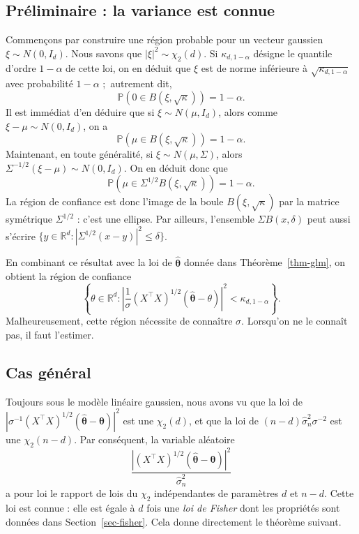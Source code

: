 \documentclass[
  10,
  letterpaper,
  DIV=11,
  numbers=noendperiod]{scrreport}
\newcommand{\bt}{\boldsymbol{\theta}}
\theoremstyle{plain}
\theoremstyle{definition}
\theoremstyle{plain}
\theoremstyle{definition}
\theoremstyle{definition}
\theoremstyle{plain}
\theoremstyle{remark}
\begin{document}
\hypertarget{pruxe9liminaire-la-variance-est-connue}{%
\subsection*{Préliminaire : la variance est
connue}\label{pruxe9liminaire-la-variance-est-connue}}

Commençons par construire une région probable pour un vecteur gaussien
\(\xi \sim N(0,I_d)\). Nous savons que \(|\xi|^2 \sim \chi_2(d)\). Si
\(\kappa_{d,1-\alpha}\) désigne le quantile d'ordre \(1-\alpha\) de
cette loi, on en déduit que \(\xi\) est de norme inférieure à
\(\sqrt{\kappa_{d,1-\alpha}}\) avec probabilité \(1-\alpha\) ;~autrement
dit, \[ \mathbb{P}(0 \in B(\xi, \sqrt{\kappa})) = 1-\alpha.\] Il est
immédiat d'en déduire que si \(\xi \sim N(\mu, I_d)\), alors comme
\(\xi - \mu \sim N(0,I_d)\), on a
\[ \mathbb{P}(\mu \in B(\xi, \sqrt{\kappa})) = 1-\alpha. \] Maintenant,
en toute généralité, si \(\xi \sim N(\mu,\Sigma)\), alors
\(\Sigma^{-1/2}(\xi - \mu) \sim N(0,I_d)\). On en déduit donc que
\[ \mathbb{P}(\mu \in \Sigma^{1/2} B(\xi, \sqrt{\kappa})) = 1-\alpha.\]
La région de confiance est donc l'image de la boule
\(B(\xi, \sqrt{\kappa})\) par la matrice symétrique \(\Sigma^{1/2}\) :
c'est une ellipse. Par ailleurs, l'ensemble \(\Sigma B(x, \delta)\) peut
aussi s'écrire
\(\{y \in \mathbb{R}^d : |\Sigma^{1/2}(x - y)|^2 \leqslant \delta\}\).

En combinant ce résultat avec la loi de \(\hat{\bt}\) donnée dans
Théorème~\ref{thm-glm}, on obtient la région de confiance
\[ \left\lbrace \theta \in \mathbb{R}^d : \left|\frac{1}{\sigma}(X^{\top} X)^{1/2}(\hat{\bt} - \theta) \right|^2 < \kappa_{d,1-\alpha} \right\rbrace.\]
Malheureusement, cette région nécessite de connaître \(\sigma\).
Lorsqu'on ne le connaît pas, il faut l'estimer.

\hypertarget{cas-guxe9nuxe9ral}{%
\subsection*{Cas général}\label{cas-guxe9nuxe9ral}}

Toujours sous le modèle linéaire gaussien, nous avons vu que la loi de
\(|\sigma^{-1}(X^{\top} X)^{1/2}(\hat{\bt} - \bt)|^2\) est une
\(\chi_2(d)\), et que la loi de \((n-d)\hat{\sigma}_n^2\sigma^{-2}\) est
une \(\chi_2(n-d)\). Par conséquent, la variable aléatoire
\[\frac{|(X^\top X)^{1/2}(\hat{\bt} - \bt)|^2}{\hat{\sigma}_n^2}\] a
pour loi le rapport de lois du \(\chi_2\) indépendantes de paramètres
\(d\) et \(n-d\). Cette loi est connue : elle est égale à \(d\) fois une
\emph{loi de Fisher} dont les propriétés sont données dans
Section~\ref{sec-fisher}. Cela donne directement le théorème suivant.
\end{document}
